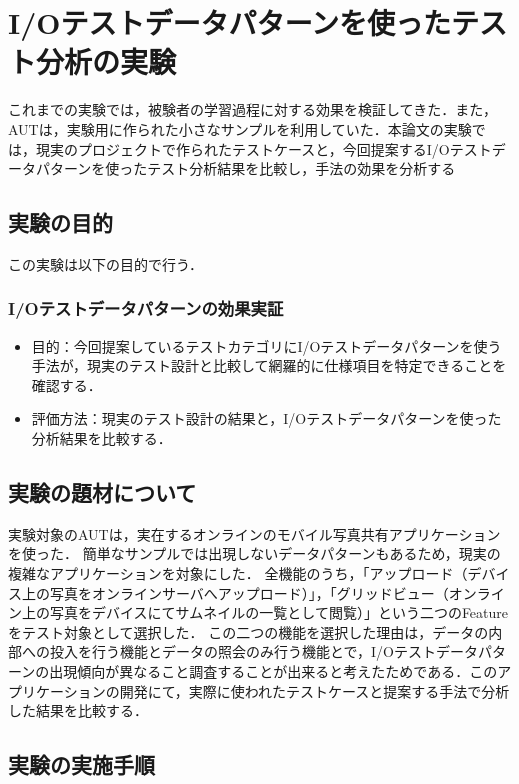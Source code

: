 \documentclass[a4paper,11pt]{jreport}
\begin{document}
\section{I/Oテストデータパターンを使ったテスト分析の実験}
これまでの実験では，被験者の学習過程に対する効果を検証してきた．また，AUTは，実験用に作られた小さなサンプルを利用していた．本論文の実験では，現実のプロジェクトで作られたテストケースと，今回提案するI/Oテストデータパターンを使ったテスト分析結果を比較し，手法の効果を分析する

\subsection{実験の目的}
この実験は以下の目的で行う．

\subsubsection{I/Oテストデータパターンの効果実証}
\begin{itemize}
\item 目的：今回提案しているテストカテゴリにI/Oテストデータパターンを使う手法が，現実のテスト設計と比較して網羅的に仕様項目を特定できることを確認する．
\item 評価方法：現実のテスト設計の結果と，I/Oテストデータパターンを使った分析結果を比較する．
\end{itemize}


\subsection{実験の題材について}
実験対象のAUTは，実在するオンラインのモバイル写真共有アプリケーションを使った．
簡単なサンプルでは出現しないデータパターンもあるため，現実の複雑なアプリケーションを対象にした．
全機能のうち，「アップロード（デバイス上の写真をオンラインサーバへアップロード）」，「グリッドビュー（オンライン上の写真をデバイスにてサムネイルの一覧として閲覧）」という二つのFeatureをテスト対象として選択した．
この二つの機能を選択した理由は，データの内部への投入を行う機能とデータの照会のみ行う機能とで，I/Oテストデータパターンの出現傾向が異なること調査することが出来ると考えたためである．このアプリケーションの開発にて，実際に使われたテストケースと提案する手法で分析した結果を比較する．

\subsection{実験の実施手順}
\end{document}
